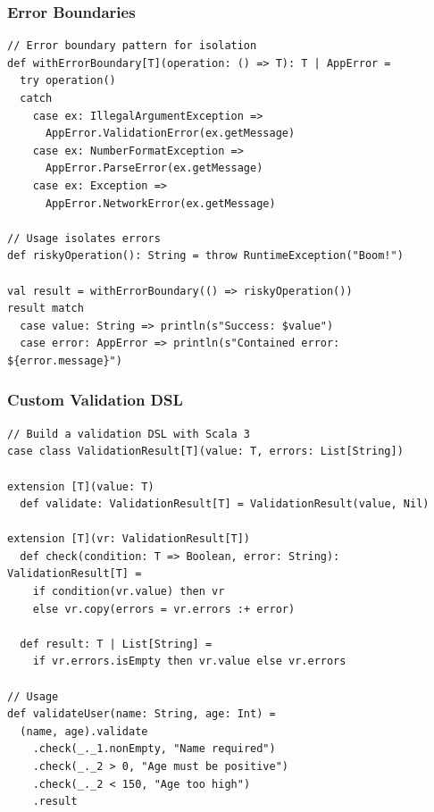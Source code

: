 \documentclass{beamer}
\begin{document}
\begin{frame}[fragile]
\frametitle{Error Boundaries}

\begin{lstlisting}[style=scalaStyle]
// Error boundary pattern for isolation
def withErrorBoundary[T](operation: () => T): T | AppError =
  try operation()
  catch 
    case ex: IllegalArgumentException => 
      AppError.ValidationError(ex.getMessage)
    case ex: NumberFormatException => 
      AppError.ParseError(ex.getMessage)
    case ex: Exception => 
      AppError.NetworkError(ex.getMessage)

// Usage isolates errors
def riskyOperation(): String = throw RuntimeException("Boom!")

val result = withErrorBoundary(() => riskyOperation())
result match
  case value: String => println(s"Success: $value")
  case error: AppError => println(s"Contained error: ${error.message}")
\end{lstlisting}

\end{frame}

\begin{frame}[fragile]
\frametitle{Custom Validation DSL}

\begin{lstlisting}[style=scalaStyle]
// Build a validation DSL with Scala 3
case class ValidationResult[T](value: T, errors: List[String])

extension [T](value: T)
  def validate: ValidationResult[T] = ValidationResult(value, Nil)
  
extension [T](vr: ValidationResult[T])
  def check(condition: T => Boolean, error: String): ValidationResult[T] =
    if condition(vr.value) then vr
    else vr.copy(errors = vr.errors :+ error)
    
  def result: T | List[String] = 
    if vr.errors.isEmpty then vr.value else vr.errors

// Usage
def validateUser(name: String, age: Int) =
  (name, age).validate
    .check(_._1.nonEmpty, "Name required")
    .check(_._2 > 0, "Age must be positive")
    .check(_._2 < 150, "Age too high")
    .result
\end{lstlisting}

\end{frame}
\end{document}
